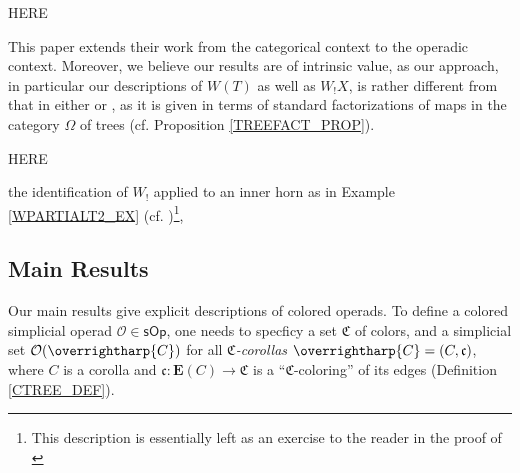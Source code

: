 \documentclass[a4paper,10pt
,draft
]{article}%
\numberwithin{equation}{section}
\numberwithin{figure}{section}
\theoremstyle{definition} %
\newcommand{\vect}[1]{\text{\overrightharp{\ensuremath{#1}}}}
\newcommand{\sOp}{\ensuremath{\mathsf{sOp}}}%
\renewcommand{\O}{\ensuremath{\mathcal O}}
\newcommand{\1}{\ensuremath{\mathbbm 1}}%
\begin{document}
{\color{red} HERE}



This paper extends their work 
from the categorical context to the operadic context.
Moreover, we believe our results are of intrinsic value,
as our approach, in particular our descriptions of $W(T)$ as well as $W_! X$,
is rather different from that in either \cite{CM13b} or \cite{DS11},
as it is given in terms of 
standard factorizations of maps in the
category $\Omega$ of trees
(cf. Proposition \ref{TREEFACT_PROP}).

{\color{red} HERE}

the identification of $W_!$ applied to an inner horn as in Example \ref{WPARTIALT2_EX} (cf. \cite[Lem. \ref{TAS-WLEFTQPUSH LEM}]{BP_TAS})\footnote{\textcolor{OliveGreen}{This description is essentially left as an exercise to the reader in the proof of \cite[Prop. 4.5]{CM13b}}},



\subsection{Main Results}


Our main results give explicit descriptions of colored operads.
To define a colored simplicial operad $\O \in \sOp$, one needs to specficy
a set $\mathfrak C$ of colors,
and a simplicial set $\O(\vect C)$ for all \textit{$\mathfrak C$-corollas} $\vect C = (C, \mathfrak c)$,
where $C$ is a corolla and $\mathfrak c \colon \boldsymbol{E}(C) \to \mathfrak C$ is a ``$\mathfrak C$-coloring'' of its edges (Definition \ref{CTREE_DEF}).
\end{document}
